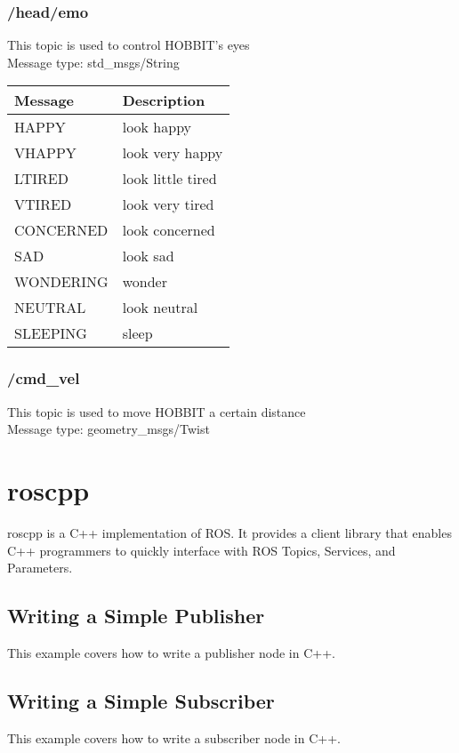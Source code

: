 \documentclass[a4paper,12pt]{article}
\begin{document}
\subsubsection*{/head/emo}
This topic is used to control HOBBIT's eyes \\
Message type: std\_msgs/String
\begin{table}[h]
    \centering
    \begin{tabular}{|l|l|}
        \hline
        Message & Description \\ \hline
        HAPPY & look happy \\ \hline
        VHAPPY & look very happy \\ \hline
        LTIRED & look little tired \\ \hline
        VTIRED & look very tired \\ \hline
        CONCERNED & look concerned \\ \hline
        SAD & look sad \\ \hline
        WONDERING & wonder \\ \hline
        NEUTRAL & look neutral \\ \hline
        SLEEPING & sleep \\ \hline
    \end{tabular}
\end{table}

\subsubsection*{/cmd\_vel}
This topic is used to move HOBBIT a certain distance\\
Message type: geometry\_msgs/Twist

\section*{roscpp}
roscpp is a C++ implementation of ROS. It provides a client library that enables C++ programmers to quickly interface with ROS Topics, Services, and Parameters.

\subsection*{Writing a Simple Publisher}
This example covers how to write a publisher node in C++.


\subsection*{Writing a Simple Subscriber}
This example covers how to write a subscriber node in C++.

\end{document}
